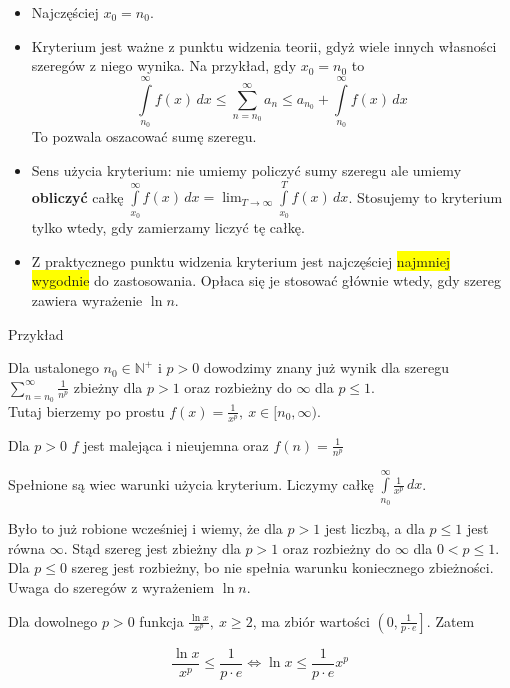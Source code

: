 \begin{itemize}
    \item Najczęściej $ x_0 = n_0 $.
    \item Kryterium jest ważne z punktu widzenia teorii, gdyż wiele innych własności szeregów z niego wynika.
    Na przykład, gdy $x_0 = n_0$ to
    $$ \int\limits_{n_0}^{\infty} f(x) \,dx \leq \sum\limits_{n = n_0}^{\infty} a_n \leq 
    a_{n_0} + \int\limits_{n_0}^{\infty} f(x) \,dx $$
    To pozwala oszacować sumę szeregu.

    \item Sens użycia kryterium: nie umiemy policzyć sumy szeregu ale umiemy \textbf{obliczyć} całkę
    $ \int\limits_{x_0}^{\infty} f(x) \,dx = \lim_{T \to \infty} \int\limits_{x_0}^{T} f(x) \,dx $. Stosujemy to
    kryterium tylko wtedy, gdy zamierzamy liczyć tę całkę.

    \item Z praktycznego punktu widzenia kryterium jest najczęściej \colorbox{yellow}{najmniej wygodnie} do zastosowania.
    Opłaca się je stosować głównie wtedy, gdy szereg zawiera wyrażenie $\ln n$. \\
\end{itemize}

Przykład

Dla ustalonego $ n_0 \in \mathbb{N}^+ $ i $p > 0$ dowodzimy znany już wynik dla szeregu $ \sum\limits_{n = n_0}^{\infty} \frac{1}{n^p} $
zbieżny dla $p > 1$ oraz rozbieżny do $\infty$ dla $p \leq 1$. \\

Tutaj bierzemy po prostu $ f(x) = \frac{1}{x^p}, \ x \in [n_0, \infty) $.

Dla $p > 0$ $f$ jest malejąca i nieujemna oraz $ f(n) = \frac{1}{n^p} $ 

Spełnione są wiec warunki użycia kryterium. Liczymy całkę $ \int\limits_{n_0}^{\infty} \frac{1}{x^p} \,dx $.

Było to już robione wcześniej i wiemy, że dla $p > 1$ jest liczbą, a dla $p \leq 1$ jest równa $\infty$.
Stąd szereg jest zbieżny dla $p > 1$ oraz rozbieżny do $\infty$ dla $0 < p \leq 1$. Dla $p \leq 0$ szereg jest rozbieżny,
bo nie spełnia warunku koniecznego zbieżności. \\

Uwaga do szeregów z wyrażeniem $\ln n$.

Dla dowolnego $p>0$ funkcja $\frac{\ln x}{x^p}, \ x \geq 2$, ma zbiór wartości $\left( 0, \frac{1}{p \cdot e} \right]$. Zatem

$$ \frac{\ln x}{x^p} \leq \frac{1}{p \cdot e} \Leftrightarrow \ln x \leq \frac{1}{p \cdot e} x^p $$

